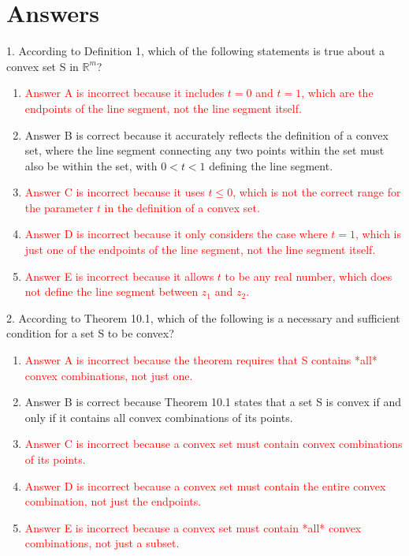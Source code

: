 \documentclass{article}%
\newcommand{\incorrect}[1]{\textcolor{red}{#1}}
\begin{document}
\section{Answers}%
\label{sec:Answers}%
1. According to Definition 1, which of the following statements is true about a convex set S in $\mathbb{R}^m$?%
\begin{enumerate}[label=\Alph*.]%
\item \incorrect{Answer A is incorrect because it includes $t=0$ and $t=1$, which are the endpoints of the line segment, not the line segment itself.}%
\item Answer B is correct because it accurately reflects the definition of a convex set, where the line segment connecting any two points within the set must also be within the set, with $0 < t < 1$ defining the line segment.%
\item \incorrect{Answer C is incorrect because it uses $t \le 0$, which is not the correct range for the parameter $t$ in the definition of a convex set.}%
\item \incorrect{Answer D is incorrect because it only considers the case where $t=1$, which is just one of the endpoints of the line segment, not the line segment itself.}%
\item \incorrect{Answer E is incorrect because it allows $t$ to be any real number, which does not define the line segment between $z_1$ and $z_2$.}%
\end{enumerate}%
\vspace{1em}%
2. According to Theorem 10.1, which of the following is a necessary and sufficient condition for a set S to be convex?%
\begin{enumerate}[label=\Alph*.]%
\item \incorrect{Answer A is incorrect because the theorem requires that S contains *all* convex combinations, not just one.}%
\item Answer B is correct because Theorem 10.1 states that a set S is convex if and only if it contains all convex combinations of its points.%
\item \incorrect{Answer C is incorrect because a convex set must contain convex combinations of its points.}%
\item \incorrect{Answer D is incorrect because a convex set must contain the entire convex combination, not just the endpoints.}%
\item \incorrect{Answer E is incorrect because a convex set must contain *all* convex combinations, not just a subset.}%
\end{enumerate}%
\end{document}
